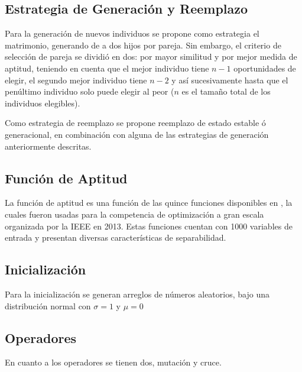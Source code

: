 \documentclass{llncs}
\begin{document}
\subsection{Estrategia de Generación y Reemplazo}
Para la generación de nuevos individuos se propone como estrategia el matrimonio, generando de a dos hijos por pareja. Sin embargo, el criterio de selección de pareja se dividió en dos: por mayor similitud y por mejor medida de aptitud, teniendo en cuenta que el mejor individuo tiene $n-1$ oportunidades de elegir, el segundo mejor individuo tiene $n-2$ y así sucesivamente hasta que el penúltimo individuo solo puede elegir al peor ($n$ es el tamaño total de los individuos elegibles).

Como estrategia de reemplazo se propone reemplazo de estado estable ó generacional, en combinación con alguna de las estrategias de generación anteriormente descritas.

\subsection{Función de Aptitud}
La función de aptitud es una función de las quince funciones disponibles en \cite{IEEE:CEC} , la cuales fueron usadas para la competencia de optimización a gran escala organizada por la IEEE en 2013. 
Estas funciones cuentan con 1000 variables de entrada y presentan diversas características de separabilidad.
\subsection{Inicialización}
Para la inicialización se generan arreglos de números aleatorios, bajo una distribución normal con $\sigma=1$ y $\mu=0$ 

\subsection{Operadores}
En cuanto a los operadores se tienen dos, mutación y cruce. 
\end{document}
